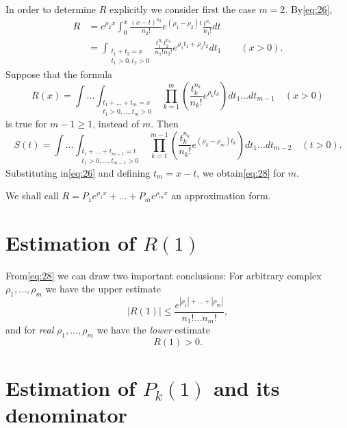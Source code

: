 In order to determine $R$ explicitly we consider first the case $m=2$. By\eqref{eq:26},
\[ \begin{aligned} R &= e^{\rho_2 x} \int_0^x \frac{(x-t)^{n_2}}{n_2!} e^{(\rho_1 - \rho_2)t} \frac{t^{n_1}}{n_1!} dt \\ &= \int_{\substack{t_1 + t_2 = x \\ t_1 > 0, t_2 > 0}} \frac{t_1^{n_1} t_2^{n_2}}{n_1! n_2!} e^{\rho_1 t_1 + \rho_2 t_2} dt_1 \qquad (x>0). \end{aligned} \]
Suppose that the formula
\begin{equation} R(x) = \int \dots \int_{\substack{t_1 + \dots + t_m = x \\ t_1 > 0, \dots, t_m > 0}} \prod_{k=1}^{m} \left( \frac{t_k^{n_k}}{n_k!} e^{\rho_k t_k} \right) dt_1 \dots dt_{m-1} \quad (x>0) \tag{28}\label{eq:28} \end{equation}
is true for $m-1 \geq 1$, instead of $m$. Then
\[ S(t) = \int \dots \int_{\substack{t_1 + \dots + t_{m-1} = t \\ t_1 > 0, \dots, t_{m-1} > 0}} \prod_{k=1}^{m-1} \left( \frac{t_k^{n_k}}{n_k!} e^{(\rho_k - \rho_m)t_k} \right) dt_1 \dots dt_{m-2} \quad (t > 0). \]
Substituting in\eqref{eq:26} and defining $t_m=x-t$, we obtain\eqref{eq:28} for $m$.

We shall call $R = P_1 e^{\rho_1 x} + \dots + P_m e^{\rho_m x}$ an approximation form.

\section{Estimation of $R(1)$}

From\eqref{eq:28} we can draw two important conclusions: For arbitrary complex $\rho_1,\ldots,\rho_m$ we have the upper estimate
\begin{equation} |R(1)| \leq \frac{e^{|\rho_1| + \dots + |\rho_m|}}{n_1! \dots n_m!}, \tag{29}\label{eq:29} \end{equation}
and for \textit{real} $\rho_1, \dots, \rho_m$ we have the \textit{lower} estimate
\begin{equation} R(1) > 0. \tag{30}\label{eq:30} \end{equation}

\section{Estimation of $P_k(1)$ and its denominator}

